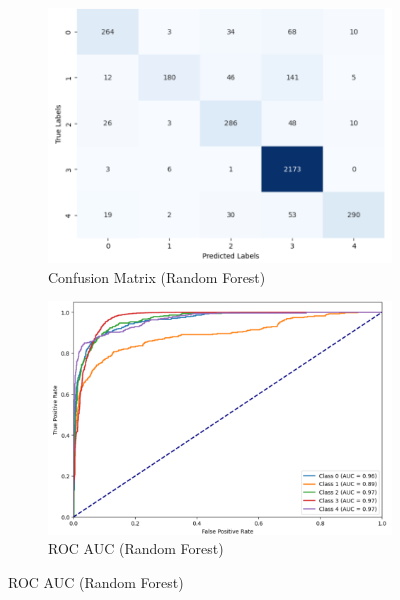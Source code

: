\pagebreak

\begin{figure}[h!]
    \centering
    \begin{subfigure}[b]{0.49\textwidth}
        \centering
        \includegraphics[width=\textwidth]{Images/RF Confusion Matrix.png}
        \caption*{Confusion Matrix (Random Forest)}
        \label{RFCM}  %
    \end{subfigure}
    \hfill
    \begin{subfigure}[b]{0.49\textwidth}
        \centering
        \includegraphics[width=\textwidth]{Images/RF ROC.png}
        \caption*{ROC AUC (Random Forest)}
        \label{RFROC}  %
    \end{subfigure}
    \label{fig:rf_comparison}
\end{figure}


